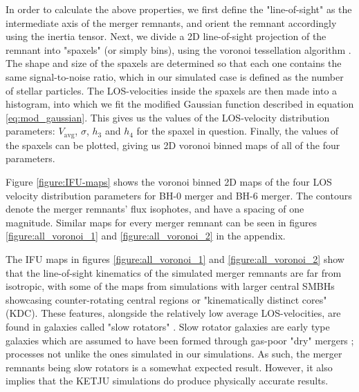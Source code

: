 \documentclass[english, oneside]{HYgradu}
\begin{document}
In order to calculate the above properties, we first define the "line-of-sight" as the intermediate axis of the merger remnants, and orient the remnant accordingly using the inertia tensor. Next, we divide a 2D line-of-sight projection of the remnant into "spaxels" (or simply bins), using the voronoi tessellation algorithm \citep{Cappellari2003}. The shape and size of the spaxels are determined so that each one contains the same signal-to-noise ratio, which in our simulated case is defined as the number of stellar particles. The LOS-velocities inside the spaxels are then made into a histogram, into which we fit the modified Gaussian function described in equation \ref{eq:mod_gaussian}. This gives us the values of the LOS-velocity distribution parameters: $V_\mathrm{avg}$, $\sigma$, $h_3$ and $h_4$ for the spaxel in question. Finally, the values of the spaxels can be plotted, giving us 2D voronoi binned maps of all of the four parameters.

Figure \ref{figure:IFU-maps} shows the voronoi binned 2D maps of the four LOS velocity distribution parameters for BH-0 merger and BH-6 merger. The contours denote the merger remnants' flux isophotes, and have a spacing of one magnitude. Similar maps for every merger remnant can be seen in figures \ref{figure:all_voronoi_1} and \ref{figure:all_voronoi_2} in the appendix.

The IFU maps in figures \ref{figure:all_voronoi_1} and \ref{figure:all_voronoi_2} show that the line-of-sight kinematics of the simulated merger remnants are far from isotropic, with some of the maps from simulations with larger central SMBHs showcasing counter-rotating central regions or "kinematically distinct cores" (KDC). These features, alongside the relatively low average LOS-velocities, are found in galaxies called "slow rotators" \citep{Emsellem2007}. Slow rotator galaxies are early type galaxies which are assumed to have been formed through gas-poor "dry" mergers \citep{Emsellem2007, Cappellari2007}; processes not unlike the ones simulated in our simulations. As such, the merger remnants being slow rotators is a somewhat expected result. However, it also implies that the KETJU simulations do produce physically accurate results.
\end{document}
